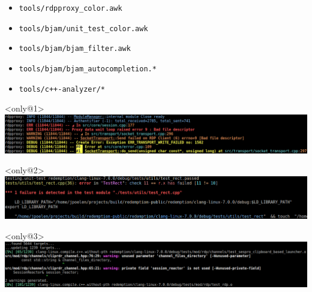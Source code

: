 \documentclass{beamer}
\newcommand{\code}[1]{\texttt{#1}}
\begin{document}
\begin{frame}[fragile]

\begin{itemize}[<+->]
 \item \lstinline{tools/rdpproxy_color.awk}
 \item \lstinline{tools/bjam/unit_test_color.awk}
 \item \lstinline{tools/bjam/bjam_filter.awk}
 \item \lstinline{tools/bjam/bjam_autocompletion.*}
 \item \lstinline{tools/c++-analyzer/*}
\end{itemize}

\begin{exampleblock}{}<only@1>
    \includegraphics[width=\linewidth]{rdpcolor.png}
\end{exampleblock}

\begin{exampleblock}{}<only@2>
    \includegraphics[width=\linewidth]{unittestcolor.png}
\end{exampleblock}

\begin{exampleblock}{}<only@3>
    \includegraphics[width=\linewidth]{bjamfilter.png}
\end{exampleblock}

\end{frame}








%
% 
\end{document}
